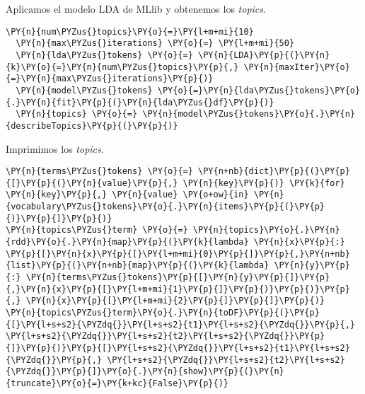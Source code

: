   
 Aplicamos el modelo LDA de MLlib y obtenemos los \textit{topics}.
  \vspace{0.5cm}
  
      \begin{tcolorbox}[breakable, size=fbox, boxrule=1pt, pad at break*=1mm,colback=cellbackground, colframe=cellborder]
  \begin{Verbatim}[commandchars=\\\{\}]
  \PY{n}{num\PYZus{}topics}\PY{o}{=}\PY{l+m+mi}{10}
  \PY{n}{max\PYZus{}iterations} \PY{o}{=} \PY{l+m+mi}{50}
  \PY{n}{lda\PYZus{}tokens} \PY{o}{=} \PY{n}{LDA}\PY{p}{(}\PY{n}{k}\PY{o}{=}\PY{n}{num\PYZus{}topics}\PY{p}{,} \PY{n}{maxIter}\PY{o}{=}\PY{n}{max\PYZus{}iterations}\PY{p}{)}
  \PY{n}{model\PYZus{}tokens} \PY{o}{=}\PY{n}{lda\PYZus{}tokens}\PY{o}{.}\PY{n}{fit}\PY{p}{(}\PY{n}{lda\PYZus{}df}\PY{p}{)}
  \PY{n}{topics} \PY{o}{=} \PY{n}{model\PYZus{}tokens}\PY{o}{.}\PY{n}{describeTopics}\PY{p}{(}\PY{p}{)}
  \end{Verbatim}
  \end{tcolorbox}

 Imprimimos los \textit{topics}.
 
\vspace{0.5cm}


    \begin{tcolorbox}[breakable, size=fbox, boxrule=1pt, pad at break*=1mm,colback=cellbackground, colframe=cellborder]
\begin{Verbatim}[commandchars=\\\{\}]
\PY{n}{terms\PYZus{}tokens} \PY{o}{=} \PY{n+nb}{dict}\PY{p}{(}\PY{p}{[}\PY{p}{(}\PY{n}{value}\PY{p}{,} \PY{n}{key}\PY{p}{)} \PY{k}{for} \PY{n}{key}\PY{p}{,} \PY{n}{value} \PY{o+ow}{in} \PY{n}{vocabulary\PYZus{}tokens}\PY{o}{.}\PY{n}{items}\PY{p}{(}\PY{p}{)}\PY{p}{]}\PY{p}{)}
\PY{n}{topics\PYZus{}term} \PY{o}{=} \PY{n}{topics}\PY{o}{.}\PY{n}{rdd}\PY{o}{.}\PY{n}{map}\PY{p}{(}\PY{k}{lambda} \PY{n}{x}\PY{p}{:} \PY{p}{[}\PY{n}{x}\PY{p}{[}\PY{l+m+mi}{0}\PY{p}{]}\PY{p}{,}\PY{n+nb}{list}\PY{p}{(}\PY{n+nb}{map}\PY{p}{(}\PY{k}{lambda} \PY{n}{y}\PY{p}{:} \PY{n}{terms\PYZus{}tokens}\PY{p}{[}\PY{n}{y}\PY{p}{]}\PY{p}{,}\PY{n}{x}\PY{p}{[}\PY{l+m+mi}{1}\PY{p}{]}\PY{p}{)}\PY{p}{)}\PY{p}{,} \PY{n}{x}\PY{p}{[}\PY{l+m+mi}{2}\PY{p}{]}\PY{p}{]}\PY{p}{)}
\PY{n}{topics\PYZus{}term}\PY{o}{.}\PY{n}{toDF}\PY{p}{(}\PY{p}{[}\PY{l+s+s2}{\PYZdq{}}\PY{l+s+s2}{t1}\PY{l+s+s2}{\PYZdq{}}\PY{p}{,} \PY{l+s+s2}{\PYZdq{}}\PY{l+s+s2}{t2}\PY{l+s+s2}{\PYZdq{}}\PY{p}{]}\PY{p}{)}\PY{p}{[}\PY{l+s+s2}{\PYZdq{}}\PY{l+s+s2}{t1}\PY{l+s+s2}{\PYZdq{}}\PY{p}{,} \PY{l+s+s2}{\PYZdq{}}\PY{l+s+s2}{t2}\PY{l+s+s2}{\PYZdq{}}\PY{p}{]}\PY{o}{.}\PY{n}{show}\PY{p}{(}\PY{n}{truncate}\PY{o}{=}\PY{k+kc}{False}\PY{p}{)}
\end{Verbatim}
\end{tcolorbox}

